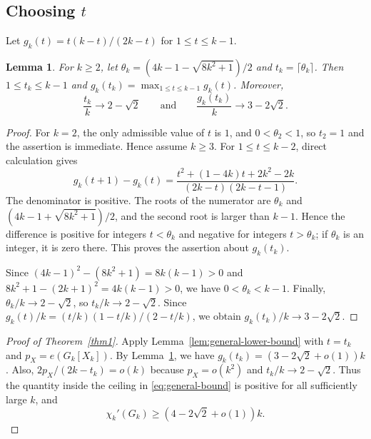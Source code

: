 \documentclass[10pt,a4paper]{amsart}
\newtheorem{lemma}[theorem]{Lemma}
\newcommand{\chik}{\chi_k'}
\begin{document}
\subsection{Choosing \texorpdfstring{$t$}{t}}
Let $g_k(t)=t(k-t)/(2k-t)$ for $1\leq t\leq k-1$.

\begin{lemma}\label{lem:choice-t}
For $k\geq2$, let
$\theta_k=(4k-1-\sqrt{8k^2+1})/2$ and
$t_k=\lceil\theta_k\rceil$. Then $1\leq t_k\leq k-1$ and
$g_k(t_k)=\max_{1\leq t\leq k-1}g_k(t)$. Moreover,
\[
\frac{t_k}{k}\longrightarrow2-\sqrt2
\qquad\text{and}\qquad
\frac{g_k(t_k)}{k}\longrightarrow3-2\sqrt2.
\]
\end{lemma}

\begin{proof}
For $k=2$, the only admissible value of $t$ is $1$, and
$0<\theta_2<1$, so $t_2=1$ and the assertion is immediate.
Hence assume $k\geq3$. For
$1\leq t\leq k-2$, direct calculation gives
\[
g_k(t+1)-g_k(t)=
\frac{t^2+(1-4k)t+2k^2-2k}{(2k-t)(2k-t-1)}.
\]
The denominator is positive. The roots of the numerator are $\theta_k$
and $(4k-1+\sqrt{8k^2+1})/2$, and the second root is larger than
$k-1$. Hence the difference is positive for integers $t<\theta_k$ and
negative for integers $t>\theta_k$; if $\theta_k$ is an integer, it is
zero there. This proves the assertion about $g_k(t_k)$.

Since $(4k-1)^2-(8k^2+1)=8k(k-1)>0$ and
$8k^2+1-(2k+1)^2=4k(k-1)>0$, we have $0<\theta_k<k-1$. Finally,
$\theta_k/k\to2-\sqrt2$, so $t_k/k\to2-\sqrt2$. Since
$g_k(t)/k=(t/k)(1-t/k)/(2-t/k)$, we obtain
$g_k(t_k)/k\to3-2\sqrt2$.
\end{proof}


\begin{proof}[Proof of Theorem~\ref{thm1}]
Apply Lemma~\ref{lem:general-lower-bound} with $t=t_k$ and
$p_X=e(G_k[X_k])$. By Lemma~\ref{lem:choice-t}, we have 
$g_k(t_k)=(3-2\sqrt2+o(1))k$. Also,
$2p_X/(2k-t_k)=o(k)$ because $p_X=o(k^2)$ and
$t_k/k\to2-\sqrt2$. Thus the quantity inside the ceiling in
\eqref{eq:general-bound} is positive for all sufficiently large $k$, and
\[
\chik(G_k)\geq(4-2\sqrt2+o(1))k.
\]
\end{proof}
\end{document}
